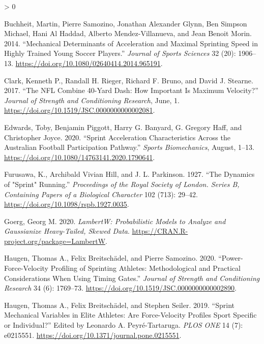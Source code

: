 \documentclass[fleqn,10pt]{wlpeerj} %
\newlength{\cslhangindent}
\newenvironment{CSLReferences}[2] %
 {%
  \setlength{\parindent}{0pt}
  \ifodd #1 \everypar{\setlength{\hangindent}{\cslhangindent}}\ignorespaces\fi
  \ifnum #2 > 0
  \setlength{\parskip}{#2\baselineskip}
  \fi
 }%
 {}
\begin{document}
\begin{CSLReferences}{1}{0}
\leavevmode\hypertarget{ref-buchheitMechanicalDeterminantsAcceleration2014}{}%
Buchheit, Martin, Pierre Samozino, Jonathan Alexander Glynn, Ben Simpson Michael, Hani Al Haddad, Alberto Mendez-Villanueva, and Jean Benoit Morin. 2014. {``Mechanical Determinants of Acceleration and Maximal Sprinting Speed in Highly Trained Young Soccer Players.''} \emph{Journal of Sports Sciences} 32 (20): 1906--13. \url{https://doi.org/10.1080/02640414.2014.965191}.

\leavevmode\hypertarget{ref-clarkNFLCombine40Yard2017}{}%
Clark, Kenneth P., Randall H. Rieger, Richard F. Bruno, and David J. Stearne. 2017. {``The {NFL Combine} 40-{Yard Dash}: {How Important} Is {Maximum Velocity}?''} \emph{Journal of Strength and Conditioning Research}, June, 1. \url{https://doi.org/10.1519/JSC.0000000000002081}.

\leavevmode\hypertarget{ref-edwardsSprintAccelerationCharacteristics2020}{}%
Edwards, Toby, Benjamin Piggott, Harry G. Banyard, G. Gregory Haff, and Christopher Joyce. 2020. {``Sprint Acceleration Characteristics Across the {Australian} Football Participation Pathway.''} \emph{Sports Biomechanics}, August, 1--13. \url{https://doi.org/10.1080/14763141.2020.1790641}.

\leavevmode\hypertarget{ref-doi:10.1098ux2frspb.1927.0035}{}%
Furusawa, K., Archibald Vivian Hill, and J. L. Parkinson. 1927. {``The Dynamics of "Sprint" Running.''} \emph{Proceedings of the Royal Society of London. Series B, Containing Papers of a Biological Character} 102 (713): 29--42. \url{https://doi.org/10.1098/rspb.1927.0035}.

\leavevmode\hypertarget{ref-R-LambertW}{}%
Goerg, Georg M. 2020. \emph{LambertW: Probabilistic Models to Analyze and Gaussianize Heavy-Tailed, Skewed Data}. \url{https://CRAN.R-project.org/package=LambertW}.

\leavevmode\hypertarget{ref-haugenPowerForceVelocityProfilingSprinting2020}{}%
Haugen, Thomas A., Felix Breitschädel, and Pierre Samozino. 2020. {``Power-{Force}-{Velocity Profiling} of {Sprinting Athletes}: {Methodological} and {Practical Considerations When Using Timing Gates}.''} \emph{Journal of Strength and Conditioning Research} 34 (6): 1769--73. \url{https://doi.org/10.1519/JSC.0000000000002890}.

\leavevmode\hypertarget{ref-haugenSprintMechanicalVariables2019}{}%
Haugen, Thomas A., Felix Breitschädel, and Stephen Seiler. 2019. {``Sprint Mechanical Variables in Elite Athletes: {Are} Force-Velocity Profiles Sport Specific or Individual?''} Edited by Leonardo A. Peyré-Tartaruga. \emph{PLOS ONE} 14 (7): e0215551. \url{https://doi.org/10.1371/journal.pone.0215551}.


\end{CSLReferences}
\end{document}
